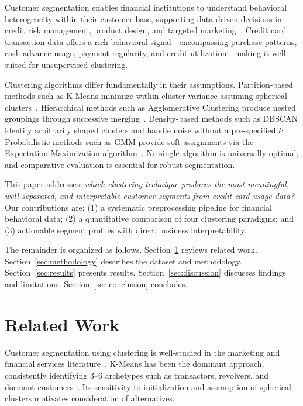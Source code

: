 \documentclass[conference]{IEEEtran}
\begin{document}
Customer segmentation enables financial institutions to understand
behavioral heterogeneity within their customer base, supporting
data-driven decisions in credit risk management, product design, and
targeted marketing~\cite{ngai2009application}. Credit card transaction
data offers a rich behavioral signal---encompassing purchase patterns,
cash advance usage, payment regularity, and credit
utilization---making it well-suited for unsupervised clustering.

Clustering algorithms differ fundamentally in their assumptions.
Partition-based methods such as K-Means minimize within-cluster
variance assuming spherical clusters~\cite{macqueen1967methods}.
Hierarchical methods such as Agglomerative Clustering produce nested
groupings through successive merging~\cite{murtagh2012algorithms}.
Density-based methods such as DBSCAN identify arbitrarily shaped
clusters and handle noise without a pre-specified
$k$~\cite{ester1996density}. Probabilistic methods such as GMM
provide soft assignments via the Expectation-Maximization
algorithm~\cite{reynolds2009gaussian}. No single algorithm is
universally optimal, and comparative evaluation is essential for
robust segmentation.

This paper addresses: \textit{which clustering technique produces the
most meaningful, well-separated, and interpretable customer segments
from credit card usage data?} Our contributions are: (1) a systematic
preprocessing pipeline for financial behavioral data; (2) a
quantitative comparison of four clustering paradigms; and (3)
actionable segment profiles with direct business interpretability.

The remainder is organized as follows. Section~\ref{sec:related}
reviews related work. Section~\ref{sec:methodology} describes the
dataset and methodology. Section~\ref{sec:results} presents results.
Section~\ref{sec:discussion} discusses findings and limitations.
Section~\ref{sec:conclusion} concludes.

\section{Related Work}
\label{sec:related}

Customer segmentation using clustering is well-studied in the
marketing and financial services
literature~\cite{ngai2009application}. K-Means has been the dominant
approach, consistently identifying 3--6 archetypes such as
transactors, revolvers, and dormant
customers~\cite{morissette2013k}. Its sensitivity to initialization
and assumption of spherical clusters motivates consideration of
alternatives.
\end{document}
